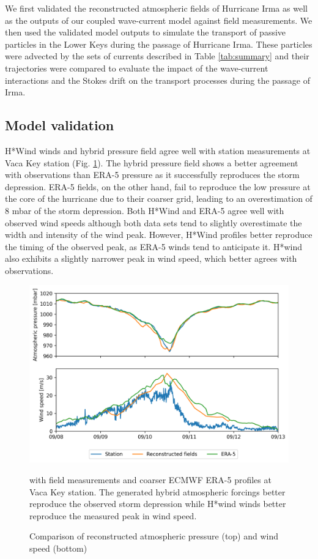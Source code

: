 \documentclass[preprint,12pt,authoryear]{elsarticle}
\begin{document}
We first validated the reconstructed atmospheric fields of Hurricane Irma as well as the outputs of our coupled wave-current model against field measurements. We then used the validated model outputs to simulate the transport of passive particles in the Lower Keys during the passage of Hurricane Irma. These particles were advected by the sets of currents described in Table \ref{tab:summary} and their trajectories were compared to evaluate the impact of the wave-current interactions and the Stokes drift on the transport processes during the passage of Irma.

\subsection{Model validation}

H*Wind winds and hybrid pressure field agree well with station measurements at Vaca Key station (Fig. \ref{fig:forcings}). The hybrid pressure field shows a better agreement with observations than ERA-5 pressure as it successfully reproduces the storm depression. ERA-5 fields, on the other hand, fail to reproduce the low pressure at the core of the hurricane due to their coarser grid, leading to an overestimation of 8 mbar of the storm depression. Both H*Wind and ERA-5 agree well with observed wind speeds although both data sets tend to slightly overestimate the width and intensity of the wind peak. However, H*Wind profiles better reproduce the timing of the observed peak, as ERA-5 winds tend to anticipate it. H*wind also exhibits a slightly narrower peak in wind speed, which better agrees with observations.

\begin{figure}
    \centering
    \includegraphics[width=.95\textwidth]{validation_met_2.png}
    \caption{Comparison of reconstructed atmospheric pressure (top) and wind speed (bottom)} with field measurements and coarser ECMWF ERA-5 profiles at Vaca Key station. The generated hybrid atmospheric forcings better reproduce the observed storm depression while H*wind winds better reproduce the measured peak in wind speed.
    \label{fig:forcings}
\end{figure}
\end{document}
